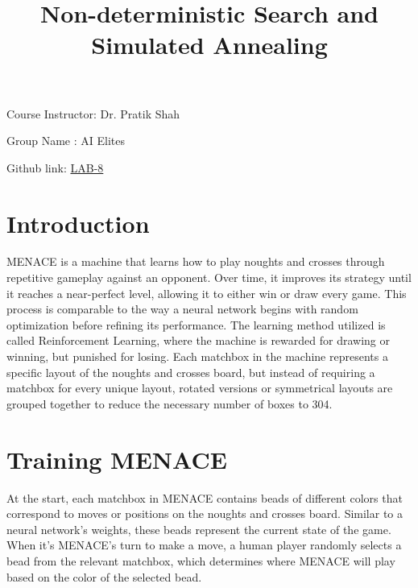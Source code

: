 \documentclass[letterpaper, 12 pt, conference]{IEEEtran}
\title{Non-deterministic Search and Simulated Annealing}
\author{\IEEEauthorblockN{Siddhesh Bhosale}
\IEEEauthorblockA{202051177}
\IEEEauthorblockA{}
\and
\IEEEauthorblockN{Rishi Raj Sachan}
\IEEEauthorblockA{202051158}
\and
\IEEEauthorblockN{Shreyansh Chachaundiya}
\IEEEauthorblockA{202051175}
\and
\IEEEauthorblockN{Nitin Kumar Das}
\IEEEauthorblockA{202051128}
}
\begin{document}
\maketitle

\setlength{\parindent}{20pt}
\begin{center}
Course Instructor: Dr. Pratik Shah
\end{center}
\begin{center}
Group Name : AI Elites
\end{center}
\begin{center}
\noindent Github link: \href{https://github.com/ShreyanshChachaundiya/AI_LABS/tree/main/Lab3}{LAB-8}
\end{center}
\maketitle

\section{Introduction}
MENACE is a machine that learns how to play noughts and crosses through repetitive gameplay against an opponent. Over time, it improves its strategy until it reaches a near-perfect level, allowing it to either win or draw every game. This process is comparable to the way a neural network begins with random optimization before refining its performance. The learning method utilized is called Reinforcement Learning, where the machine is rewarded for drawing or winning, but punished for losing. Each matchbox in the machine represents a specific layout of the noughts and crosses board, but instead of requiring a matchbox for every unique layout, rotated versions or symmetrical layouts are grouped together to reduce the necessary number of boxes to 304.
\section{Training MENACE}
At the start, each matchbox in MENACE contains beads of different colors that correspond to moves or positions on the noughts and crosses board. Similar to a neural network's weights, these beads represent the current state of the game. When it's MENACE's turn to make a move, a human player randomly selects a bead from the relevant matchbox, which determines where MENACE will play based on the color of the selected bead.
\end{document}
